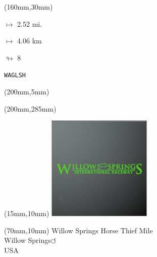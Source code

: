 \begin{textblock*}{40mm}(160mm,30mm)%
\Large
\par$\mapsto$ 2.52 mi.
\par$\mapsto$ 4.06 km
\par$\looparrowright$ 8
\par\hfill\tiny\tt WAGLSH\\
\end{textblock*}
\begin{textblock*}{20mm}(200mm,5mm)%
\fbox{\thepage}
\label{WAGLSH}
\end{textblock*}
\begin{textblock*}{20mm}(200mm,285mm)%
\fbox{\thepage}
\end{textblock*}

\null\newpage
\begin{textblock*}{50mm}(15mm,10mm)%
\includegraphics[width=50mm]{LG/2015-05-20_00098.png}
\end{textblock*}
\begin{textblock*}{130mm}(70mm,10mm)%
{\fontsize{20}{20}\selectfont Willow Springs Horse Thief Mile\\}
{\fontsize{16}{16}\selectfont Willow Springs\hfill \huge$\circlearrowleft$\\}
{\fontsize{12}{12}\selectfont USA\\}
\end{textblock*}
